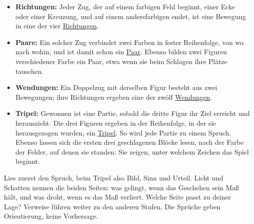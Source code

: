 \documentclass[12pt,paper=a5,DIV=13,headings=small,twoside=true,open=any]{scrbook}
\DeclareRobustCommand\verzkapitel[1]{\par\addvspace{1.6ex}\noindent\textbf{#1}\par\nobreak\vspace{0.4ex}}
\newcommand\verzkap[1]{\addtocontents{ver}{\protect\verzkapitel{#1}}}
\begin{document}
\begin{itemize}[leftmargin=*, itemsep=0pt, parsep=0pt, topsep=2pt]
  \item \textbf{Richtungen:} Jeder Zug, der auf einem farbigen Feld beginnt, einer Ecke oder einer Kreuzung, und auf einem andersfarbigen endet, ist eine Bewegung in eine der vier \hyperref[kap:beziehungen]{Richtungen}.
  \item \textbf{Paare:} Ein solcher Zug verbindet zwei Farben in fester Reihenfolge, von wo nach wohin, und ist damit schon ein \hyperref[kap:paare]{Paar}. Ebenso bilden zwei Figuren verschiedener Farbe ein Paar, etwa wenn sie beim Schlagen ihre Plätze tauschen.
  \item \textbf{Wendungen:} Ein Doppelzug mit derselben Figur besteht aus zwei Bewegungen; ihre Richtungen ergeben eine der zwölf \hyperref[kap:muster]{Wendungen}.
  \item \textbf{Tripel:} Gewonnen ist eine Partie, sobald die dritte Figur ihr Ziel erreicht und herauszieht. Die drei Figuren ergeben in der Reihenfolge, in der sie herausgezogen wurden, ein \hyperref[kap:tripel]{Tripel}. So wird jede Partie zu einem Spruch. Ebenso lassen sich die ersten drei geschlagenen Blöcke lesen, nach der Farbe der Felder, auf denen sie standen: Sie zeigen, unter welchem Zeichen das Spiel beginnt.
\end{itemize}

\enlargethispage{\baselineskip}

Lies zuerst den Spruch, beim Tripel also Bild, Sinn und Urteil. Licht und Schatten nennen die beiden Seiten: was gelingt, wenn das Geschehen sein Maß hält, und was droht, wenn es das Maß verliert. Welche Seite passt zu deiner Lage? Verweise führen weiter zu den anderen Stufen. Die Sprüche geben Orientierung, keine Vorhersage.


\newpage
\begingroup
\centering
\setlength{\parindent}{0pt}
\setlength{\parskip}{0.3ex}
\renewcommand{\raggedsection}{\centering}

\label{kap:elemente}\verzkap{Die fünf Elemente}
\end{document}
